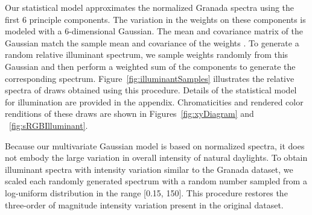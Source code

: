 \documentclass{jov}
\begin{document}
Our statistical model approximates the normalized Granada spectra using the first 6 principle components.
The variation in the weights on these components is modeled with a 6-dimensional Gaussian.
The mean and covariance matrix of the Gaussian match the sample mean and covariance of the weights \cite{BrainardFreeman}. 
To generate a random relative illuminant spectrum, we sample weights randomly from this Gaussian and then perform a weighted sum of the components to generate the corresponding spectrum.
Figure~\ref{fig:illuminantSamples} illustrates the relative spectra of draws obtained using this procedure.
Details of the statistical model for illumination are provided in the appendix.
Chromaticities and rendered color renditions of these draws are shown in Figures~\ref{fig:xyDiagram} and ~\ref{fig:sRGBIlluminant}.

Because our multivariate Gaussian model is based on normalized spectra, it does not embody the large variation in overall intensity of natural daylights.
To obtain illuminant spectra with intensity variation similar to the Granada dataset, we scaled each randomly generated spectrum with a random number sampled from a log-uniform distribution in the range [0.15, 150].
This procedure restores the three-order of magnitude intensity variation present in the original dataset.
\end{document}
